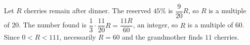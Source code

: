 Let $R$ cherries remain after dinner. The reserved $45\%$ is $\dfrac{9}{20}R$, so $R$ is a multiple of 20. The number found is $\dfrac{1}{3}\cdot\dfrac{11}{20}R=\dfrac{11R}{60}$, an integer, so $R$ is a multiple of 60. Since $0<R<111$, necessarily $R=60$ and the grandmother finds $\boxed{11}$ cherries.
